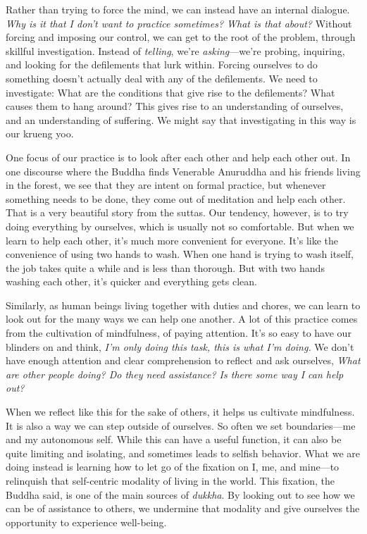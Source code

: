 Rather than trying to force the mind, we can instead have an internal
dialogue. \emph{Why is it that I don't want to practice
\mbox{sometimes?} What is that about?} Without forcing and imposing our
control, we can get to the root of the problem, through skillful
investigation. Instead of \emph{telling}, we're \emph{asking}---we're
probing, inquiring, and looking for the defilements that lurk within.
Forcing ourselves to do something doesn't actually deal with any of the
defilements. We need to investigate: What are the conditions that give
rise to the defilements?  What causes them to hang around? This gives
rise to an understanding of ourselves, and an understanding of
suffering. We might say that investigating in this way is our krueng
yoo.


One focus of our practice is to look after each other and help each 
other out. In one discourse where the Buddha finds Venerable Anuruddha 
and his friends living in the forest, we see that they are intent on 
formal practice, but whenever something needs to be done, they come out 
of meditation and help each other. That is a very beautiful story from 
the suttas. Our tendency, however, is to try doing everything by 
ourselves, which is usually not so comfortable. But when we learn to 
help each other, it's much more convenient for everyone. It's like the 
convenience of using two hands to wash. When one hand is trying to wash 
itself, the job takes quite a while and is less than thorough. But with 
two hands washing each other, it's quicker and everything gets clean.

Similarly, as human beings living together with duties and chores, we 
can learn to look out for the many ways we can help one another. A lot 
of this practice comes from the cultivation of mindfulness, of paying 
attention. It's so easy to have our blinders on and think, \emph{I'm 
only doing this task, this is what I'm doing.} We don't have enough 
attention and clear comprehension to reflect and ask ourselves, 
\emph{What are other people doing? Do they need assistance? Is there 
some way I can help out?}

When we reflect like this for the sake of others, it helps us cultivate 
mindfulness. It is also a way we can step outside of ourselves. So 
often we set boundaries---me and my autonomous self. While this can 
have a useful function, it can also be quite limiting and isolating, 
and sometimes leads to selfish behavior. What we are doing instead is 
learning how to let go of the fixation on I, me, and mine---to 
relinquish that self-centric modality of living in the world. This 
fixation, the Buddha said, is one of the main sources of \emph{dukkha}. 
By looking out to see how we can be of assistance to others, we 
undermine that modality and give ourselves the opportunity to 
experience well-being.

